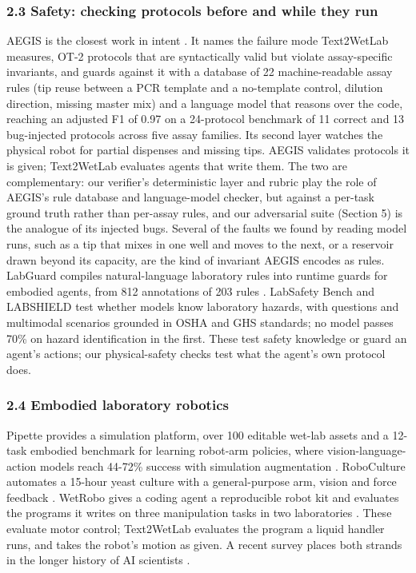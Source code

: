 \documentclass[
]{article}
\begin{document}
\subsubsection{2.3 Safety: checking protocols before and while they
run}\label{safety-checking-protocols-before-and-while-they-run}

AEGIS is the closest work in intent \citep{setty2026aegis}. It names the
failure mode Text2WetLab measures, OT-2 protocols that are syntactically
valid but violate assay-specific invariants, and guards against it with
a database of 22 machine-readable assay rules (tip reuse between a PCR
template and a no-template control, dilution direction, missing master
mix) and a language model that reasons over the code, reaching an
adjusted F1 of 0.97 on a 24-protocol benchmark of 11 correct and 13
bug-injected protocols across five assay families. Its second layer
watches the physical robot for partial dispenses and missing tips. AEGIS
validates protocols it is given; Text2WetLab evaluates agents that write
them. The two are complementary: our verifier's deterministic layer and
rubric play the role of AEGIS's rule database and language-model
checker, but against a per-task ground truth rather than per-assay
rules, and our adversarial suite (Section 5) is the analogue of its
injected bugs. Several of the faults we found by reading model runs,
such as a tip that mixes in one well and moves to the next, or a
reservoir drawn beyond its capacity, are the kind of invariant AEGIS
encodes as rules. LabGuard compiles natural-language laboratory rules
into runtime guards for embodied agents, from 812 annotations of 203
rules \citep{yang2026labguard}. LabSafety Bench
\citep{zhou2026labsafety} and LABSHIELD \citep{sun2026labshield} test
whether models know laboratory hazards, with questions and multimodal
scenarios grounded in OSHA and GHS standards; no model passes 70\% on
hazard identification in the first. These test safety knowledge or guard
an agent's actions; our physical-safety checks test what the agent's own
protocol does.

\subsubsection{2.4 Embodied laboratory
robotics}\label{embodied-laboratory-robotics}

Pipette provides a simulation platform, over 100 editable wet-lab assets
and a 12-task embodied benchmark for learning robot-arm policies, where
vision-language-action models reach 44-72\% success with simulation
augmentation \citep{liu2026pipette}. RoboCulture automates a 15-hour
yeast culture with a general-purpose arm, vision and force feedback
\citep{angers2025roboculture}. WetRobo gives a coding agent a
reproducible robot kit and evaluates the programs it writes on three
manipulation tasks in two laboratories \citep{oikawa2026wetrobo}. These
evaluate motor control; Text2WetLab evaluates the program a liquid
handler runs, and takes the robot's motion as given. A recent survey
places both strands in the longer history of AI scientists
\citep{king2026aiscientists}.
\end{document}
